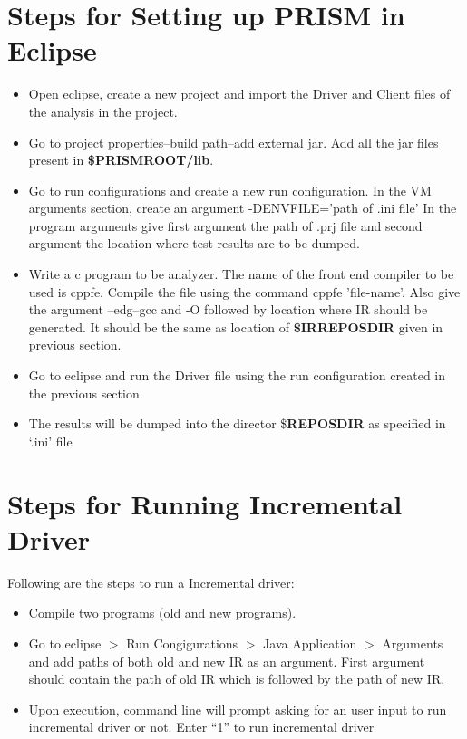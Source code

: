 \documentclass[11pt,a4paper,openright]{report}
\begin{document}
\section{Steps for Setting up PRISM in Eclipse}
\begin{itemize}
 \item Open eclipse, create a new project and import the Driver and Client files of the analysis in the project.
 \item Go to project properties–build path–add external jar. Add all the jar files present in \textbf{\$PRISMROOT/lib}.
 \item Go to run configurations and create a new run configuration. In the VM arguments section, create an argument -DENVFILE=’path of .ini
file’ In the program arguments give first argument the path of .prj file and second argument the location where test results are to be dumped.
\item Write a c program to be analyzer. The name of the front end compiler to be used is cppfe. Compile the file using the command cppfe ’file-name’.
Also give the argument –edg–gcc and -O followed by location where IR should be generated. It should be the same as location of \textbf{\$IRREPOSDIR} given in
previous section.
\item Go to eclipse and run the Driver file using the run configuration created in the previous section.
\item The results will be dumped into the director \$\textbf{REPOSDIR} as specified in `.ini' file
\end{itemize}

\section{Steps for Running Incremental Driver} 
Following are the steps to run a Incremental driver:
\begin{itemize}
 \item Compile two programs (old and new programs).
 \item Go to eclipse $>$ Run Congigurations $>$ Java Application $>$ Arguments and add paths of both old and new IR as an argument. First argument should contain the path of old IR  
 which is followed by the path of new IR.
 \item Upon execution, command line will prompt asking for an user input to run incremental driver or not. Enter ``1'' to run incremental driver
 
\end{itemize}
\end{document}

